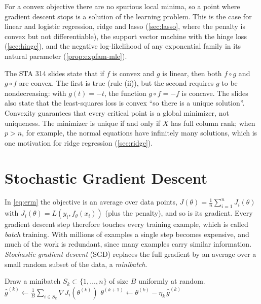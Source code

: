 For a convex objective there are no spurious local minima, so a point where gradient descent stops is a solution of the learning problem. This is the case for linear and logistic regression, ridge and lasso (\cref{sec:lasso}, where the penalty is convex but not differentiable), the support vector machine with the hinge loss (\cref{sec:hinge}), and the negative log-likelihood of any exponential family in its natural parameter (\cref{prop:expfam-mle}).

\begin{remark}\label{rem:convex-corrections}
The STA 314 slides state that if $f$ is convex and $g$ is linear, then both $f\circ g$ and $g\circ f$ are convex. The first is true (rule (ii)), but the second requires $g$ to be nondecreasing: with $g(t)=-t$, the function $g\circ f=-f$ is concave. The slides also state that the least-squares loss is convex ``so there is a unique solution''. Convexity guarantees that every critical point is a global minimizer, not uniqueness. The minimizer is unique if and only if $X$ has full column rank; when $p>n$, for example, the normal equations have infinitely many solutions, which is one motivation for ridge regression (\cref{sec:ridge}).
\end{remark}

\section{Stochastic Gradient Descent}\label{sec:sgd}

In \eqref{eq:erm} the objective is an average over data points, $J(\theta)=\frac1n\sum_{i=1}^nJ_i(\theta)$ with $J_i(\theta)=L(y_i,f_\theta(x_i))$ (plus the penalty), and so is its gradient. Every gradient descent step therefore touches every training example, which is called \emph{batch} training. With millions of examples a single step becomes expensive, and much of the work is redundant, since many examples carry similar information. \emph{Stochastic gradient descent} (SGD) replaces the full gradient by an average over a small random subset of the data, a \emph{minibatch}.

\begin{algorithm}[H]
\caption{Minibatch Stochastic Gradient Descent (SGD)}\label{alg:sgd}
\begin{algorithmic}[1]
  \State Draw a minibatch $S_k\subset\{1,\dots,n\}$ of size $B$ uniformly at random.
  \State $\hat g^{(k)}\gets\frac1B\sum_{i\in S_k}\nabla J_i(\theta^{(k)})$ 
  \State $\theta^{(k+1)}\gets\theta^{(k)}-\eta_k\,\hat g^{(k)}$
\EndFor
{}
\end{algorithmic}
\end{algorithm}

